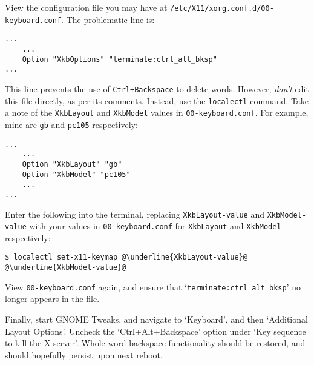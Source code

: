 \documentclass[a4paper]{article}
\begin{document}
View the configuration file you may have at \lstinline|/etc/X11/xorg.conf.d/00-keyboard.conf|.
The problematic line is:
\begin{lstlisting}
...
    ...
    Option "XkbOptions" "terminate:ctrl_alt_bksp"
...
\end{lstlisting}
This line prevents the use of \lstinline|Ctrl+Backspace| to delete words.
However, \emph{don't} edit this file directly, as per its comments.
Instead, use the \lstinline|localectl| command.
Take a note of the \lstinline|XkbLayout| and \lstinline|XkbModel| values in \lstinline|00-keyboard.conf|.
For example, mine are \lstinline|gb| and \lstinline|pc105| respectively:
\begin{lstlisting}
...
    ...
    Option "XkbLayout" "gb"
    Option "XkbModel" "pc105"
    ...
...
\end{lstlisting}
Enter the following into the terminal, replacing \lstinline|XkbLayout-value| and \lstinline|XkbModel-value| with your values in \lstinline|00-keyboard.conf| for \lstinline|XkbLayout| and \lstinline|XkbModel| respectively:
\begin{lstlisting}[escapechar=@]
$ localectl set-x11-keymap @\underline{XkbLayout-value}@ @\underline{XkbModel-value}@
\end{lstlisting}
View \lstinline|00-keyboard.conf| again, and ensure that `\lstinline|terminate:ctrl_alt_bksp|' no longer appears in the file.

Finally, start GNOME Tweaks, and navigate to `Keyboard', and then `Additional Layout Options'.
Uncheck the `Ctrl+Alt+Backspace' option under `Key sequence to kill the X server'.
Whole-word backspace functionality should be restored, and should hopefully persist upon next reboot.




\end{document}
